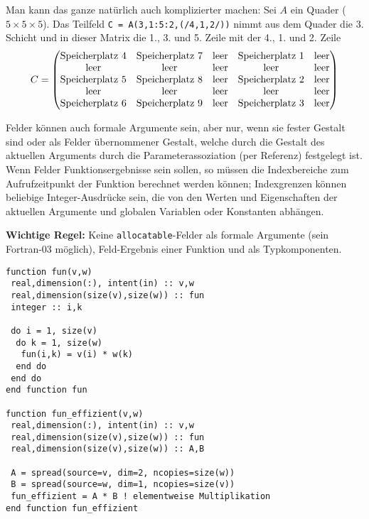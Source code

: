 Man kann das ganze natürlich auch komplizierter machen: Sei $A$ ein Quader ($5\times 5\times 5$). Das Teilfeld \texttt{C = A(3,1:5:2,(/4,1,2/))} nimmt aus dem Quader die 3. Schicht und in dieser Matrix die 1., 3. und 5. Zeile mit der 4., 1. und 2. Zeile
\begin{align}
	C = \begin{pmatrix}
		\text{Speicherplatz 4} & \text{Speicherplatz 7} & \text{leer} & \text{Speicherplatz 1} & \text{leer}\\
		\text{leer} & \text{leer} & \text{leer} & \text{leer} & \text{leer}\\
		\text{Speicherplatz 5} & \text{Speicherplatz 8} & \text{leer} & \text{Speicherplatz 2} & \text{leer}\\
		\text{leer} & \text{leer} & \text{leer} & \text{leer} & \text{leer}\\
		\text{Speicherplatz 6} & \text{Speicherplatz 9} & \text{leer} & \text{Speicherplatz 3} & \text{leer}
	\end{pmatrix}\notag
\end{align}

Felder können auch formale Argumente sein, aber nur, wenn sie fester Gestalt sind oder als Felder übernommener Gestalt, welche durch die Gestalt des aktuellen Arguments durch die Parameterassoziation (per Referenz) festgelegt ist. Wenn Felder Funktionsergebnisse sein sollen, so müssen die Indexbereiche zum Aufrufzeitpunkt der Funktion berechnet werden können; Indexgrenzen können beliebige Integer-Ausdrücke sein, die von den Werten und Eigenschaften der aktuellen Argumente und globalen Variablen oder Konstanten abhängen.

\textbf{Wichtige Regel: } Keine \texttt{allocatable}-Felder als formale Argumente (sein Fortran-03 möglich), Feld-Ergebnis einer Funktion und als Typkomponenten.

\begin{lstlisting}
function fun(v,w)
 real,dimension(:), intent(in) :: v,w
 real,dimension(size(v),size(w)) :: fun
 integer :: i,k
 
 do i = 1, size(v)
  do k = 1, size(w)
   fun(i,k) = v(i) * w(k)
  end do
 end do
end function fun

function fun_effizient(v,w)
 real,dimension(:), intent(in) :: v,w
 real,dimension(size(v),size(w)) :: fun
 real,dimension(size(v),size(w)) :: A,B
 
 A = spread(source=v, dim=2, ncopies=size(w))
 B = spread(source=w, dim=1, ncopies=size(v)) 
 fun_effizient = A * B ! elementweise Multiplikation
end function fun_effizient
\end{lstlisting}

